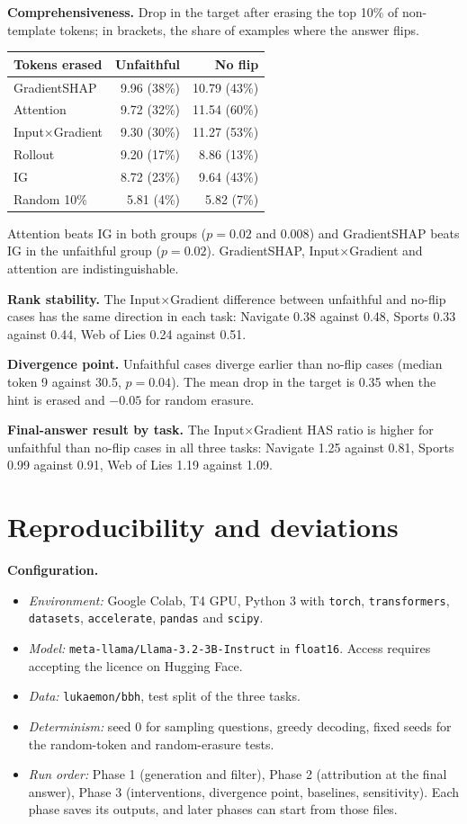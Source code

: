 \documentclass[10pt,a4paper,twocolumn]{article}
\newcommand{\ixg}{Input$\times$Gradient}
\newcommand{\para}[1]{\textbf{#1}}
\begin{document}
\para{Comprehensiveness.} Drop in the target after erasing the top 10\% of non-template tokens; in brackets, the share of examples where the answer flips.
\begin{center}\footnotesize
\begin{tabular}{@{}lrr@{}}
\toprule
Tokens erased & Unfaithful & No flip \\
\midrule
GradientSHAP & 9.96 (38\%) & 10.79 (43\%) \\
Attention & 9.72 (32\%) & 11.54 (60\%) \\
\ixg & 9.30 (30\%) & 11.27 (53\%) \\
Rollout & 9.20 (17\%) & 8.86 (13\%) \\
IG & 8.72 (23\%) & 9.64 (43\%) \\
Random 10\% & 5.81 (4\%) & 5.82 (7\%) \\
\bottomrule
\end{tabular}
\end{center}
Attention beats IG in both groups ($p=0.02$ and $0.008$) and GradientSHAP beats IG in the unfaithful group ($p=0.02$). GradientSHAP, \ixg{} and attention are indistinguishable.

\para{Rank stability.} The \ixg{} difference between unfaithful and no-flip cases has the same direction in each task: Navigate 0.38 against 0.48, Sports 0.33 against 0.44, Web of Lies 0.24 against 0.51.

\para{Divergence point.} Unfaithful cases diverge earlier than no-flip cases (median token 9 against 30.5, $p=0.04$). The mean drop in the target is 0.35 when the hint is erased and $-0.05$ for random erasure.

\para{Final-answer result by task.} The \ixg{} HAS ratio is higher for unfaithful than no-flip cases in all three tasks: Navigate 1.25 against 0.81, Sports 0.99 against 0.91, Web of Lies 1.19 against 1.09.

\section{Reproducibility and deviations}
\label{app:repro}

\para{Configuration.}
\begin{itemize}
\item \emph{Environment:} Google Colab, T4 GPU, Python 3 with \texttt{torch}, \texttt{transformers}, \texttt{datasets}, \texttt{accelerate}, \texttt{pandas} and \texttt{scipy}.
\item \emph{Model:} \texttt{meta-llama/Llama-3.2-3B-Instruct} in \texttt{float16}. Access requires accepting the licence on Hugging Face.
\item \emph{Data:} \texttt{lukaemon/bbh}, test split of the three tasks.
\item \emph{Determinism:} seed 0 for sampling questions, greedy decoding, fixed seeds for the random-token and random-erasure tests.
\item \emph{Run order:} Phase 1 (generation and filter), Phase 2 (attribution at the final answer), Phase 3 (interventions, divergence point, baselines, sensitivity). Each phase saves its outputs, and later phases can start from those files.
\end{itemize}
\end{document}
